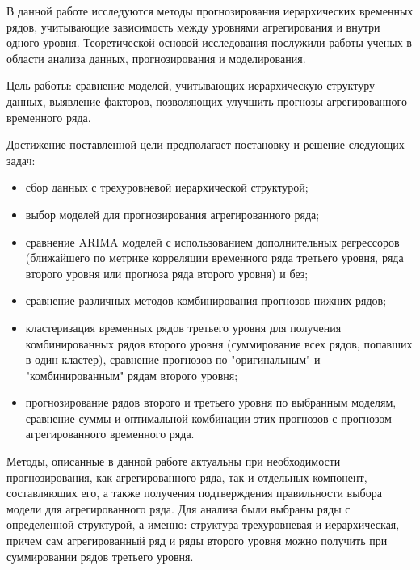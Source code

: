 \documentclass[12pt,a4paper, oneside]{extreport}
\begin{document}
В данной работе исследуются методы прогнозирования иерархических временных рядов, учитывающие зависимость между уровнями агрегирования и внутри одного уровня. Теоретической основой исследования послужили работы ученых в области анализа данных, прогнозирования и моделирования.



Цель работы: сравнение моделей, учитывающих иерархическую структуру данных, выявление факторов, позволяющих улучшить прогнозы агрегированного временного ряда.



Достижение поставленной цели предполагает постановку и решение следующих задач:

\begin{itemize}
	\item сбор данных с трехуровневой иерархической структурой;
	\item выбор моделей для прогнозирования агрегированного ряда;
	\item сравнение ARIMA моделей с использованием дополнительных регрессоров (ближайшего по метрике корреляции временного ряда третьего уровня, ряда второго уровня или прогноза ряда второго уровня) и без;    
	\item сравнение различных методов комбинирования прогнозов нижних рядов; 
	\item кластеризация временных рядов третьего уровня для получения комбинированных рядов второго уровня (суммирование всех рядов, попавших в один кластер), сравнение прогнозов по  "оригинальным" и "комбинированным" рядам второго уровня;
	\item прогнозирование рядов второго и третьего уровня по выбранным моделям, сравнение суммы и оптимальной комбинации этих прогнозов с прогнозом агрегированного временного ряда.

\end{itemize}


Методы, описанные в данной работе актуальны при необходимости прогнозирования, как агрегированного ряда, так и отдельных компонент, составляющих его, а также получения подтверждения правильности выбора модели для агрегированного ряда.
Для анализа были выбраны ряды с определенной структурой, а именно: 
структура трехуровневая и иерархическая, причем сам агрегированный ряд и ряды второго уровня можно получить при суммировании рядов третьего уровня. 
\end{document}
